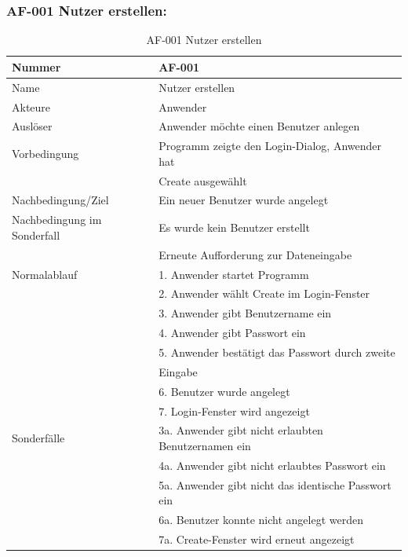 \documentclass[13pt,a4paper,bibliography=totocnumbered,listof=totocnumbered]{scrartcl}
\begin{document}
\subsubsection{AF-001 Nutzer erstellen:}
\begin{table}[!h]
	\centering
	\begin{tabular}{|l|l|}
		\hline
		Nummer & AF-001\\
		\hline
		Name & Nutzer erstellen\\
		\hline
		Akteure & Anwender\\
		\hline
		Auslöser & Anwender möchte einen Benutzer anlegen\\
		\hline
		Vorbedingung & Programm zeigte den Login-Dialog, Anwender hat \\ &  Create ausgewählt\\
		\hline
		Nachbedingung/Ziel & Ein neuer Benutzer wurde angelegt \\
		\hline
		Nachbedingung im Sonderfall & Es wurde kein Benutzer erstellt \\ & Erneute Aufforderung zur Dateneingabe\\
		\hline
		Normalablauf & 1. Anwender startet Programm \\ & 2. Anwender wählt Create im Login-Fenster\\ & 3. Anwender gibt Benutzername ein \\ & 4. Anwender gibt Passwort ein \\ & 5. Anwender bestätigt das Passwort durch zweite\\ &Eingabe\\& 6. Benutzer wurde angelegt\\& 7. Login-Fenster wird angezeigt \\
		\hline
		Sonderfälle & 3a. Anwender gibt nicht erlaubten Benutzernamen ein \\ & 4a. Anwender gibt nicht erlaubtes Passwort ein \\& 5a. Anwender gibt nicht das identische Passwort ein\\& 6a. Benutzer konnte nicht angelegt werden \\& 7a. Create-Fenster wird erneut angezeigt\\
		\hline
	\end{tabular}
	\caption{AF-001 Nutzer erstellen}
	\label{tab:AF-001 Nutzer erstellen}
\end{table}
\pagebreak
\end{document}
